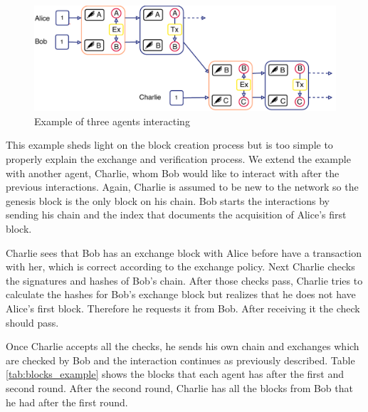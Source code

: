 \begin{figure}
    \centering
    \includegraphics[width=\textwidth]{images/trustchain_example.pdf}
    \caption{Example of three agents interacting}
    \label{fig:exchange_example}
\end{figure}

This example sheds light on the block creation process but is too simple to properly explain the 
exchange and verification process. We extend the example with another agent, Charlie, whom Bob would
like to interact with after the previous interactions. Again, Charlie is assumed to be new to the 
network so the genesis block is the only block on his chain. Bob starts the interactions by sending
his chain and the index that documents the acquisition of Alice's first block. 

Charlie sees that Bob has an exchange block with Alice before have a transaction with her, which is 
correct according to the exchange policy. Next Charlie checks the signatures and hashes of Bob's chain. 
After those checks pass, Charlie tries to calculate the hashes for Bob's exchange block but realizes
that he does not have Alice's first block. Therefore he requests it from Bob. After receiving it the
check should pass. 

Once Charlie accepts all the checks, he sends his own chain and exchanges which are checked by Bob
and the interaction continues as previously described. Table \ref{tab:blocks_example} shows the
blocks that each agent has after the first and second round. After the second round, Charlie has 
all the blocks from Bob that he had after the first round.

